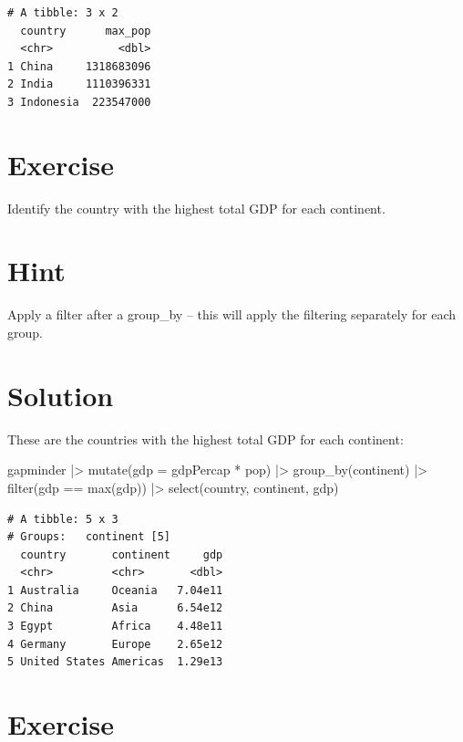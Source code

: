\documentclass[
  letterpaper,
  DIV=11,
  numbers=noendperiod]{scrreprt}
\newenvironment{Shaded}{\begin{snugshade}}{\end{snugshade}}
\newcommand{\AttributeTok}[1]{\textcolor[rgb]{0.40,0.45,0.13}{#1}}
\newcommand{\FunctionTok}[1]{\textcolor[rgb]{0.28,0.35,0.67}{#1}}
\newcommand{\NormalTok}[1]{\textcolor[rgb]{0.00,0.23,0.31}{#1}}
\newcommand{\SpecialCharTok}[1]{\textcolor[rgb]{0.37,0.37,0.37}{#1}}
\begin{document}
\begin{verbatim}
# A tibble: 3 x 2
  country      max_pop
  <chr>          <dbl>
1 China     1318683096
2 India     1110396331
3 Indonesia  223547000
\end{verbatim}

\section{Exercise}

Identify the country with the highest total GDP for each continent.

\section{Hint}

Apply a filter after a group\_by -- this will apply the filtering
separately for each group.

\section{Solution}

These are the countries with the highest total GDP for each continent:

\begin{Shaded}
\begin{Highlighting}[]
\NormalTok{gapminder }\SpecialCharTok{|\textgreater{}}
  \FunctionTok{mutate}\NormalTok{(}\AttributeTok{gdp =}\NormalTok{ gdpPercap }\SpecialCharTok{*}\NormalTok{ pop) }\SpecialCharTok{|\textgreater{}}
  \FunctionTok{group\_by}\NormalTok{(continent) }\SpecialCharTok{|\textgreater{}}
  \FunctionTok{filter}\NormalTok{(gdp }\SpecialCharTok{==} \FunctionTok{max}\NormalTok{(gdp)) }\SpecialCharTok{|\textgreater{}}
  \FunctionTok{select}\NormalTok{(country, continent, gdp)}
\end{Highlighting}
\end{Shaded}

\begin{verbatim}
# A tibble: 5 x 3
# Groups:   continent [5]
  country       continent     gdp
  <chr>         <chr>       <dbl>
1 Australia     Oceania   7.04e11
2 China         Asia      6.54e12
3 Egypt         Africa    4.48e11
4 Germany       Europe    2.65e12
5 United States Americas  1.29e13
\end{verbatim}

\section{Exercise}
\end{document}
